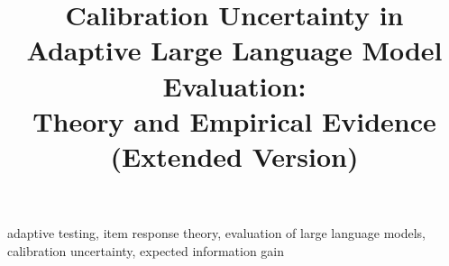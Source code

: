 \documentclass[twoside,11pt]{article}
\begin{document}
\title{Calibration Uncertainty in Adaptive Large Language Model Evaluation:\\ Theory and Empirical Evidence (Extended Version)}

\author{\PaperAuthors}


\maketitle



\begin{keywords}
  adaptive testing, item response theory, evaluation of large language models,
  calibration uncertainty, expected information gain
\end{keywords}
















\vskip 0.2in

\end{document}

